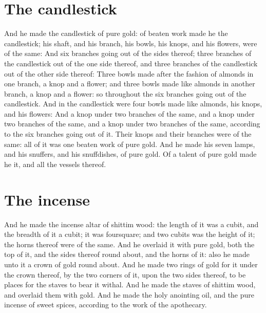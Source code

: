 \begin{biblechapter}
\section*{The candlestick}
\verse And he made the candlestick of pure gold: of beaten work made he the candlestick; his shaft, and his branch, his bowls, his knops, and his flowers, were of the same:
\verse And six branches going out of the sides thereof; three branches of the candlestick out of the one side thereof, and three branches of the candlestick out of the other side thereof:
\verse Three bowls made after the fashion of almonds in one branch, a knop and a flower; and three bowls made like almonds in another branch, a knop and a flower: so throughout the six branches going out of the candlestick.
\verse And in the candlestick were four bowls made like almonds, his knops, and his flowers:
\verse And a knop under two branches of the same, and a knop under two branches of the same, and a knop under two branches of the same, according to the six branches going out of it.
\verse Their knops and their branches were of the same: all of it was one beaten work of pure gold.
\verse And he made his seven lamps, and his snuffers, and his snuffdishes, of pure gold.
\verse Of a talent of pure gold made he it, and all the vessels thereof.
\section*{The incense}
\verse And he made the incense altar of shittim wood: the length of it was a cubit, and the breadth of it a cubit; it was foursquare; and two cubits was the height of it; the horns thereof were of the same.
\verse And he overlaid it with pure gold, both the top of it, and the sides thereof round about, and the horns of it: also he made unto it a crown of gold round about.
\verse And he made two rings of gold for it under the crown thereof, by the two corners of it, upon the two sides thereof, to be places for the staves to bear it withal.
\verse And he made the staves of shittim wood, and overlaid them with gold.
\verse And he made the holy anointing oil, and the pure incense of sweet spices, according to the work of the apothecary.
\end{biblechapter}

